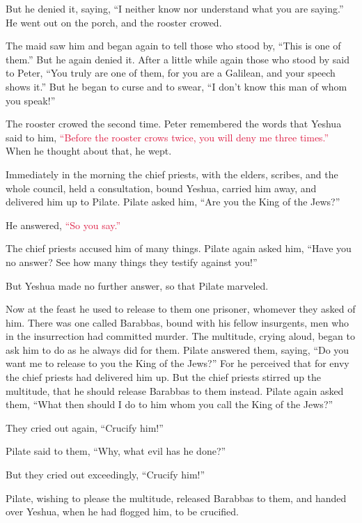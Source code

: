 \myverse{}But he denied it, saying, “I neither know nor understand what
you are saying.” He went out on the porch, and the rooster crowed.

\myverse{}The maid saw him and began again to tell those who stood by,
“This is one of them.”
\myverse{}But he again denied it. After a little while again those who stood by said
to Peter, “You truly are one of them, for you are a Galilean, and your speech shows it.”
\myverse{}But he began to curse and to swear, “I don’t know this man of whom you speak!”

\myverse{}The rooster crowed the second time. Peter remembered the words
that Yeshua said to him,
\textcolor{crimson}{“Before the rooster crows twice, you will deny me three times.”} When he thought about that, he
wept.


\mychapter{} \myverse*{}Immediately in the morning the chief priests, with the elders,
scribes, and the whole council, held a consultation, bound Yeshua, carried him away, and delivered him
up to Pilate.
\myverse{}Pilate asked him, “Are you the King of the Jews?”

He answered,
\textcolor{crimson}{“So you say.”}

\myverse{}The chief priests accused him of many things.
\myverse{}Pilate again asked him, “Have you no answer? See how many things they testify
against you!”

\myverse{}But Yeshua made no further answer, so that Pilate marveled.

\myverse{}Now at the feast he used to release to them one prisoner, whomever
they asked of him.
\myverse{}There was one called Barabbas, bound with his fellow insurgents, men who in
the insurrection had committed murder.
\myverse{}The multitude, crying aloud, began to ask him to do as he always did for them.
\myverse{}Pilate answered them, saying, “Do you want me to release to you the King of
the Jews?”
\myverse{}For he perceived that for envy the chief priests had delivered him up.
\myverse{}But the chief priests stirred up the multitude, that he should release Barabbas
to them instead.
\myverse{}Pilate again asked them, “What then should I do to him whom you call the
King of the Jews?”

\myverse{}They cried out again, “Crucify him!”

\myverse{}Pilate said to them, “Why, what evil has he done?”

But they cried out exceedingly, “Crucify him!”

\myverse{}Pilate, wishing to please the multitude, released Barabbas to
them, and handed over Yeshua, when he had flogged him, to be crucified.

